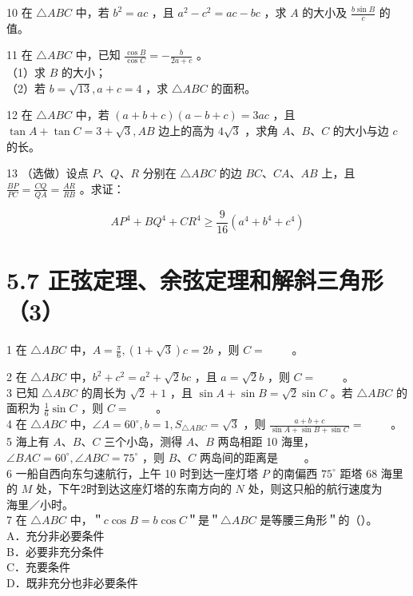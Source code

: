 \documentclass[10pt]{article}
\begin{document}
10 在 \(\triangle A B C\) 中，若 \(b^{2}=a c\) ，且 \(a^{2}-c^{2}=a c-b c\) ，求 \(A\) 的大小及 \(\frac{b \sin B}{c}\) 的值。

11 在 \(\triangle A B C\) 中，已知 \(\frac{\cos B}{\cos C}=-\frac{b}{2 a+c}\) 。\\
（1）求 \(B\) 的大小；\\
（2）若 \(b=\sqrt{13}, a+c=4\) ，求 \(\triangle A B C\) 的面积。

12 在 \(\triangle A B C\) 中，若 \((a+b+c)(a-b+c)=3 a c\) ，且 \(\tan A+\tan C=3+\sqrt{3}, A B\) 边上的高为 \(4 \sqrt{3}\) ，求角 \(A 、 B 、 C\) 的大小与边 \(c\) 的长。

13 （选做）设点 \(P 、 Q 、 R\) 分别在 \(\triangle A B C\) 的边 \(B C 、 C A 、 A B\) 上，且 \(\frac{B P}{P C}=\frac{C Q}{Q A}=\frac{A R}{R B}\) 。求证：

\[
A P^{4}+B Q^{4}+C R^{4} \geqslant \frac{9}{16}\left(a^{4}+b^{4}+c^{4}\right)
\]

\section*{5.7 正弦定理、余弦定理和解斜三角形（3）}
1 在 \(\triangle A B C\) 中，\(A=\frac{\pi}{6},(1+\sqrt{3}) c=2 b\) ，则 \(C=\) \(\qquad\)。

2 在 \(\triangle A B C\) 中，\(b^{2}+c^{2}=a^{2}+\sqrt{2} b c\) ，且 \(a=\sqrt{2} b\) ，则 \(C=\) \(\qquad\)。\\
3 已知 \(\triangle A B C\) 的周长为 \(\sqrt{2}+1\) ，且 \(\sin A+\sin B=\sqrt{2} \sin C\) 。若 \(\triangle A B C\) 的面积为 \(\frac{1}{6} \sin C\) ，则 \(C=\) \(\qquad\)。\\
4 在 \(\triangle A B C\) 中，\(\angle A=60^{\circ}, b=1, S_{\triangle A B C}=\sqrt{3}\) ，则 \(\frac{a+b+c}{\sin A+\sin B+\sin C}=\) \(\qquad\)。\\
5 海上有 \(A 、 B 、 C\) 三个小岛，测得 \(A 、 B\) 两岛相距 10 海里，\(\angle B A C=60^{\circ}, \angle A B C=75^{\circ}\) ，则 \(B 、 C\) 两岛间的距离是 \(\qquad\)。\\
6 一船自西向东匀速航行，上午 10 时到达一座灯塔 \(P\) 的南偏西 \(75^{\circ}\) 距塔 68 海里的 \(M\) 处，下午2时到达这座灯塔的东南方向的 \(N\) 处，则这只船的航行速度为 \(\qquad\)海里／小时。\\
7 在 \(\triangle A B C\) 中，＂\(c \cos B=b \cos C\)＂是＂\(\triangle A B C\) 是等腰三角形＂的（）。\\
A．充分非必要条件\\
B．必要非充分条件\\
C．充要条件\\
D．既非充分也非必要条件
\end{document}
